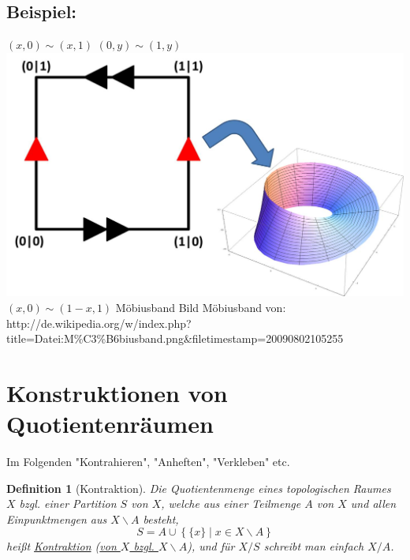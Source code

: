 \documentclass[a4paper,11pt,notitlepage]{report}
\newtheorem{definition}{Definition}[chapter]
\newenvironment{bsp}[1]
{
\setlength{\fboxsep}{10pt}
\subsection*{Beispiel: #1}
\begin{upshape}
}
{
\end{upshape}
}
\begin{document}
\begin{bsp}{}
	$(x,0) \sim (x,1)$
	\newline
	$(0,y) \sim (1,y)$
	\newline
	\includegraphics[scale=0.6]{images/Quotient_Moebius.jpg}\newline
	$(x,0) \sim (1-x,1)$
	\newline Möbiusband \newline
	\scriptsize{Bild Möbiusband von:\\ http://de.wikipedia.org/w/index.php?title=Datei:M\%C3\%B6biusband.png\&filetimestamp=20090802105255}
\end{bsp}


\newpage
\section{Konstruktionen von Quotientenräumen}
Im Folgenden "Kontrahieren", "Anheften", "Verkleben" etc.

\begin{definition}[Kontraktion]
	Die Quotientenmenge eines topologischen Raumes $X$ bzgl. einer Partition $S$ von $X$, welche aus einer Teilmenge $A$ von $X$ und allen Einpunktmengen aus $X \backslash A$ besteht, $$S = A \cup \left\{\{x\} \mid x \in X \backslash A\right \}$$
	heißt \underline{Kontraktion} (\underline{von $X$ bzgl. $X \backslash A$}), und für $X/S$ schreibt man einfach $X/A$.
\end{definition}
\end{document}
